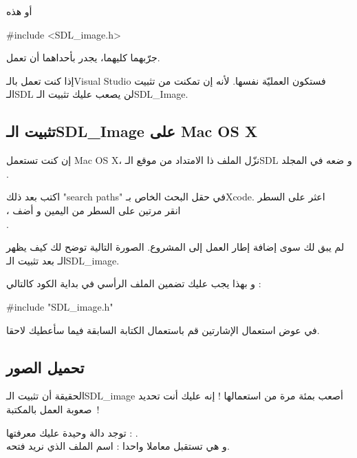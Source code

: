 أو هذه

\begin{Csource}
#include <SDL_image.h>
\end{Csource}

جرّبهما كليهما، يجدر بأحداهما أن تعمل.

\begin{information}
إذا كنت تعمل بالـ\textenglish{Visual Studio}
فستكون العمليّة نفسها. لأنه إن تمكنت من تثبيت الـ\textenglish{SDL}
لن يصعب عليك تثبيت الـ\textenglish{SDL\_Image}.
\end{information}

\subsection{تثبيت الـ\textenglish{SDL\_Image} على \textenglish{Mac OS X}}


إن كنت تستعمل
\textenglish{Mac OS X}،
نزّل الملف ذا الامتداد
من موقع الـ\textenglish{SDL}
و ضعه في المجلد\\
.

اكتب بعد ذلك
"\textenglish{search paths}"
 في حقل البحث الخاص بـ\textenglish{Xcode}.
 اعثر على السطر\\
،
 انقر مرتين على السطر من اليمين و أضف\\
.

لم يبق لك سوى إضافة إطار العمل إلى المشروع. الصورة التالية توضح لك كيف يظهر\\
الـ
بعد تثبيت الـ\textenglish{SDL\_image}.


و بهذا يجب عليك تضمين الملف الرأسي في بداية الكود كالتالي :
\begin{Csource}
#include "SDL_image.h"
\end{Csource}
في عوض استعمال الإشارتين
\InlineCode{< >}
 قم باستعمال الكتابة السابقة فيما سأعطيك لاحقا.

\subsection{تحميل الصور}

الحقيقة أن تثبيت الـ\textenglish{SDL\_image}
أصعب بمئة مرة من استعمالها ! إنه عليك أنت تحديد صعوبة العمل بالمكتبة~! 

توجد دالة وحيدة عليك معرفتها : 
.\\
و هي تستقبل معاملا واحدا : اسم الملف الذي نريد فتحه.

